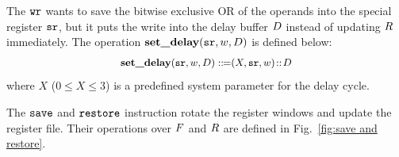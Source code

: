 The $\texttt{wr}$ wants to save the bitwise exclusive OR of
the operands into the special register $\texttt{sr}$, but
it puts the write into the delay buffer $D$
instead of updating $R$ immediately.
The operation $\textbf{set\_delay}(\texttt{sr}, w, D)$
is defined below:
\[
	\small
	\begin{array}{l}
		\textbf{set\_delay}(\texttt{sr}, w, D) ::\!\!{=} (X, \texttt{sr}, w) 
		\!::\! D \\
	\end{array}
\]
where $X$ ($0 \leq X \leq 3$) is a
predefined system parameter for the delay cycle. 

The $\texttt{save}$ and $\texttt{restore}$ instruction rotate
the register windows and update the register file.
Their operations over $F$ and $R$
are defined in Fig.~\ref{fig:save and restore}.

%
%
%
